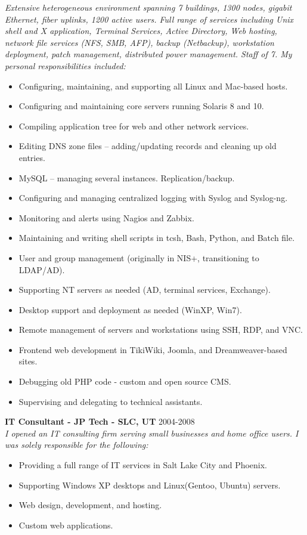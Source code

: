 \documentclass[line,margin]{res}
\begin{document}
\begin{resume}
 {\sl Extensive heterogeneous environment spanning 7 buildings, 1300 nodes, gigabit Ethernet, fiber uplinks, 1200 active users. Full range of services including Unix shell and X application, Terminal Services, Active Directory, Web hosting, network file services (NFS, SMB, AFP), backup (Netbackup), workstation deployment, patch management, distributed power management. Staff of 7. My personal responsibilities included:}
   \begin{itemize} \itemsep -2pt
   \item Configuring, maintaining, and supporting all Linux and Mac-based hosts.
   \item Configuring and maintaining core servers running Solaris 8 and 10.
   \item Compiling application tree for web and other network services.
   \item Editing DNS zone files – adding/updating records and cleaning up old entries.
   \item MySQL – managing several instances. Replication/backup. 
   \item Configuring and managing centralized logging with Syslog and Syslog-ng.
   \item Monitoring and alerts using Nagios and Zabbix.
   \item Maintaining and writing shell scripts in tcsh, Bash, Python, and Batch file.
   \item User and group management (originally in NIS+, transitioning to LDAP/AD).
   \item Supporting NT servers as needed (AD, terminal services, Exchange).
   \item Desktop support and deployment as needed (WinXP, Win7).
   \item Remote management of servers and workstations using SSH, RDP, and VNC.
   \item Frontend web development in TikiWiki, Joomla, and Dreamweaver-based sites.
   \item Debugging old PHP code - custom and open source CMS.
   \item Supervising and delegating to technical assistants.
   \end{itemize}
 {\bf IT Consultant - JP Tech - SLC, UT} \hfill 2004-2008\\
 {\sl I opened an IT consulting firm serving small businesses and home office users. I was solely responsible for the following:}
  \begin{itemize} \itemsep -2pt
  \item Providing a full range of IT services in Salt Lake City and Phoenix.
  \item Supporting Windows XP desktops and Linux(Gentoo, Ubuntu) servers.
  \item Web design, development, and hosting.
  \item Custom web applications.
  \end{itemize}


\end{resume}
\end{document}
